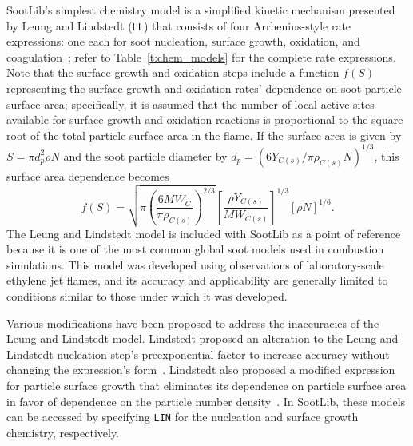 \documentclass[preprint,12pt,letterpaper]{elsarticle}
\begin{document}
SootLib's simplest chemistry model is a simplified kinetic mechanism presented by Leung and Lindstedt (\texttt{LL}) that consists of four Arrhenius-style rate expressions: one each for soot nucleation, surface growth, oxidation, and coagulation~\cite{Leung_1991}; refer to  Table~\ref{t:chem_models} for the complete rate expressions. Note that the surface growth and oxidation steps include a function $f(S)$ representing the surface growth and oxidation rates' dependence on soot particle surface area; specifically, it is assumed that the number of local active sites available for surface growth and oxidation reactions is proportional to the square root of the total particle surface area in the flame. If the surface area is given by $S=\pi d_p^2 \rho N$ and the soot particle diameter by $d_p=(6Y_{C(s)}/\pi \rho_{C(s)} N)^{1/3}$, this surface area dependence becomes
\begin{equation}
    \label{e:surface_area}
    f(S) = \sqrt{\pi \left( \frac{6MW_{C}}{\pi \rho_{C(s)}} \right) ^{2/3}} \left[ \frac{\rho Y_{C(s)}}{MW_{C(s)}} \right]^{1/3} [\rho N]^{1/6}.
\end{equation}
The Leung and Lindstedt model is included with SootLib as a point of reference because it is one of the most common global soot models used in combustion simulations. This model was developed using observations of laboratory-scale ethylene jet flames, and its accuracy and applicability are generally limited to conditions similar to those under which it was developed.

Various modifications have been proposed to address the inaccuracies of the Leung and Lindstedt model. Lindstedt proposed an alteration to the Leung and Lindstedt nucleation step's preexponential factor to increase accuracy without changing the expression's form~\cite{Lindstedt_2005}. Lindstedt also proposed a modified expression for particle surface growth that eliminates its dependence on particle surface area in favor of dependence on the particle number density~\cite{Lindstedt_1994}. In SootLib, these models can be accessed by specifying \texttt{LIN} for the nucleation and surface growth chemistry, respectively.
\end{document}
